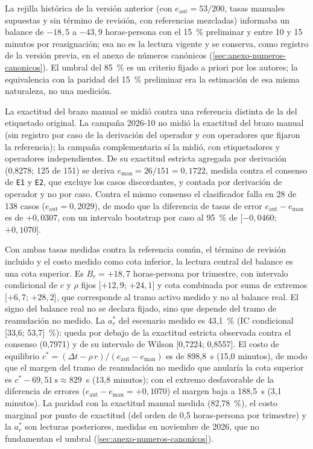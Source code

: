 \begin{table}[htbp]
\end{table}

La rejilla histórica de la versión anterior (con \(e_{\mathrm{aut}} = 53/200\), tasas manuales supuestas y sin término de revisión, con referencias mezcladas) informaba un balance de \(-18{,}5\) a \(-43{,}9\) horas-persona con el 15~\% preliminar y entre 10 y 15 minutos por reasignación; esa no es la lectura vigente y se conserva, como registro de la versión previa, en el anexo de números canónicos (\autoref{sec:anexo-numeros-canonicos}). El umbral del 85~\% es un criterio fijado a priori por los autores; la equivalencia con la paridad del 15~\% preliminar era la estimación de esa misma naturaleza, no una medición.

La exactitud del brazo manual se midió contra una referencia distinta de la del etiquetado original. La campaña 2026-10 no midió la exactitud del brazo manual (sin registro por caso de la derivación del operador y con operadores que fijaron la referencia); la campaña complementaria sí la midió, con etiquetadores y operadores independientes. De su exactitud estricta agregada por derivación (0,8278; 125 de 151) se deriva \(e_{\mathrm{man}} = 26/151 = 0{,}1722\), medida contra el consenso de \texttt{E1} y \texttt{E2}, que excluye los casos discordantes, y contada por derivación de operador y no por caso. Contra el mismo consenso el clasificador falla en 28 de 138 casos (\(e_{\mathrm{aut}} = 0{,}2029\)), de modo que la diferencia de tasas de error \(e_{\mathrm{aut}} - e_{\mathrm{man}}\) es de \(+0{,}0307\), con un intervalo bootstrap por caso al 95~\% de [\(-0{,}0460\); \(+0{,}1070\)].

Con ambas tasas medidas contra la referencia común, el término de revisión incluido y el costo medido como cota inferior, la lectura central del balance es una cota superior. Es \(B_r = +18{,}7\) horas-persona por trimestre, con intervalo condicional de \(c\) y \(\rho\) fijos [\(+12{,}9\); \(+24{,}1\)] y cota combinada por suma de extremos [\(+6{,}7\); \(+28{,}2\)], que corresponde al tramo activo medido y no al balance real. El signo del balance real no se declara fijado, sino que depende del tramo de reanudación no medido. La \(a^{*}_r\) del escenario medido es 43,1~\% (IC condicional [33,6; 53,7]~\%): queda por debajo de la exactitud estricta observada contra el consenso (0,7971) y de su intervalo de Wilson [0,7224; 0,8557]. El costo de equilibrio \(c^{*} = (\Delta t - \rho\,r)/(e_{\mathrm{aut}} - e_{\mathrm{man}})\) es de 898,8~s (15,0 minutos), de modo que el margen del tramo de reanudación no medido que anularía la cota superior es \(c^{*} - 69{,}51~\text{s} \approx 829\)~s (13,8 minutos); con el extremo desfavorable de la diferencia de errores (\(e_{\mathrm{aut}} - e_{\mathrm{man}} = +0{,}1070\)) el margen baja a 188,5~s (3,1 minutos). La paridad con la exactitud manual medida (82,78~\%), el costo marginal por punto de exactitud (del orden de 0,5 horas-persona por trimestre) y la \(a^{*}_r\) son lecturas posteriores, medidas en noviembre de 2026, que no fundamentan el umbral (\autoref{sec:anexo-numeros-canonicos}).

